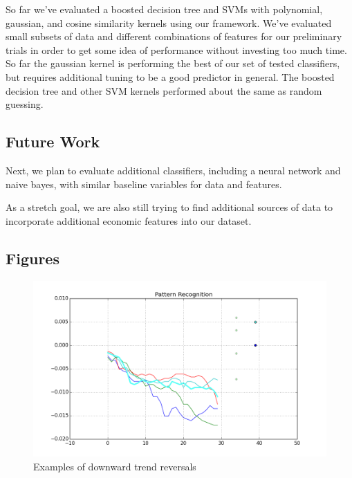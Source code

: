 \documentclass{article}
\begin{document}
So far we've evaluated a boosted decision tree and SVMs with polynomial, gaussian, and cosine similarity kernels using our framework. We've evaluated small subsets of data and different combinations of features for our preliminary trials in order to get some idea of performance without investing too much time. So far the gaussian kernel is performing the best of our set of tested classifiers, but requires additional tuning to be a good predictor in general. The boosted decision tree and other SVM kernels performed about the same as random guessing.

\subsection{Future Work}

Next, we plan to evaluate additional classifiers, including a neural network and naive bayes, with similar baseline variables for data and features.

As a stretch goal, we are also still trying to find additional sources of data to incorporate additional economic features into our dataset.

\subsection{Figures}

\begin{figure}[h!]
\begin{center}
        \includegraphics[scale=0.3]{figure_2}
        \caption{Examples of downward trend reversals}
\end{center}
\end{figure}
\end{document}
